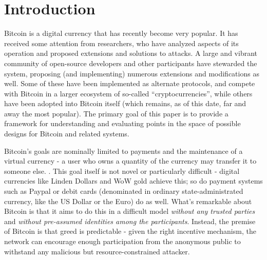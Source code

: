\section{Introduction}\label{intro}

Bitcoin is a digital currency that has recently become very popular.  It has received some attention from researchers, who have analyzed aspects of its operation and proposed extensions and solutions to attacks. A large and vibrant community of open-source developers and other participants have stewarded the system, proposing (and implementing) numerous extensions and modifications as well. Some of these have been implemented as alternate protocols, and compete with Bitcoin in a larger ecosystem of so-called ``cryptocurrencies'', while others have been adopted into Bitcoin itself (which remains, as of this date, far and away the most popular). The primary goal of this paper is to provide a framework for understanding and evaluating points in the space of possible designs for Bitcoin and related systems.

Bitcoin's goals are nominally limited to payments and the maintenance of a virtual currency - a user who owns a quantity of the currency may transfer it to someone else. . This goal itself is not novel or particularly difficult - digital currencies like Linden Dollars and WoW gold achieve this; so do payment systems such as Paypal or debit cards (denominated in ordinary state-administrated currency, like the US Dollar or the Euro) do as well. What's remarkable about Bitcoin is that it aims to do this in a difficult model {\em without any trusted parties} and {\em without pre-assumed identities among the participants}. Instead, the premise of Bitcoin is that greed is predictable - given the right incentive mechanism, the network can encourage enough participation from the anonymous public to withstand any malicious but resource-constrained attacker. 


